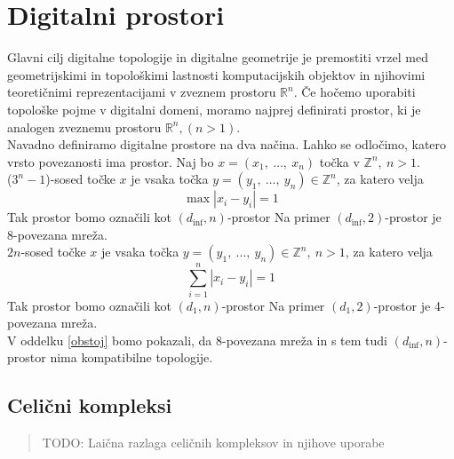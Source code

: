 \documentclass[a4paper, 12pt]{book}
\theoremstyle{definition}
\begin{document}
\chapter{Digitalni prostori}
Glavni cilj digitalne topologije in digitalne geometrije je premostiti vrzel
med geometrijskimi in topološkimi lastnosti komputacijskih objektov in njihovimi
teoretičnimi reprezentacijami v zveznem prostoru $\mathbb{R}^n$. Če hočemo uporabiti
topološke pojme v digitalni domeni, moramo najprej definirati prostor, ki je
analogen zveznemu prostoru $\mathbb{R}^n, (n > 1)$.\\
Navadno definiramo digitalne prostore na dva načina. Lahko se odločimo, katero 
vrsto povezanosti ima prostor. Naj bo $x = (x_1,\ \dots,\ x_n)$
točka v $\mathbb{Z}^n,\ n > 1$.\\
  ($3^n-1$)-sosed točke $x$ je vsaka točka
  $y = (y_1,\ \dots,\ y_n) \in \mathbb{Z}^n$, za katero velja
  \[
    \max|x_i - y_i| = 1
  \]
  Tak prostor bomo označili kot $(d_{\inf},n)$-prostor
  Na primer $(d_{\inf},2)$-prostor je 8-povezana mreža.\\
  $2n$-sosed točke $x$ je vsaka točka $y = (y_1,\ \dots,\ y_n) \in \mathbb{Z}^n,\ n > 1$,
  za katero velja
  \[
    \sum_{i=1}^{n}|x_i - y_i| = 1
  \]
  Tak prostor bomo označili kot $(d_1,n)$-prostor
  Na primer $(d_1,2)$-prostor je 4-povezana mreža.\\
  V oddelku \ref{obstoj} bomo pokazali, da 8-povezana mreža in s tem tudi $(d_{\inf},n)$-prostor nima kompatibilne topologije.
\section{Celični kompleksi}
\begin{quote}
    TODO: Laična razlaga celičnih kompleksov in njihove uporabe
\end{quote}
\end{document}
